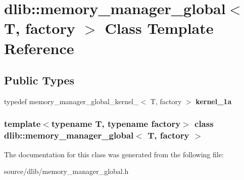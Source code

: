 \hypertarget{classdlib_1_1memory__manager__global}{
\section{dlib::memory\_\-manager\_\-global$<$ T, factory $>$ Class Template Reference}
\label{classdlib_1_1memory__manager__global}
}
\subsection*{Public Types}
\begin{DoxyCompactItemize}
\item 
\hypertarget{classdlib_1_1memory__manager__global_a9911ae7d4d97aea9726f641da8dd1683}{
typedef memory\_\-manager\_\-global\_\-kernel\_$<$ T, factory $>$ {\bfseries kernel\_\-1a}}
\label{classdlib_1_1memory__manager__global_a9911ae7d4d97aea9726f641da8dd1683}

\end{DoxyCompactItemize}
\subsubsection*{template$<$typename T, typename factory$>$ class dlib::memory\_\-manager\_\-global$<$ T, factory $>$}



The documentation for this class was generated from the following file:\begin{DoxyCompactItemize}
\item 
source/dlib/memory\_\-manager\_\-global.h\end{DoxyCompactItemize}
